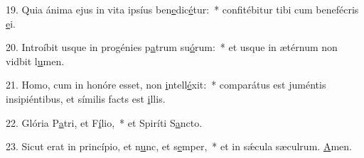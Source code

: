 19. Quia ánima ejus in vita ipsíus ben\uline{e}dic\uline{é}tur:~* confitébitur tibi cum benefécris \uline{e}i.\par 
20. Introíbit usque in progénies p\uline{a}trum su\uline{ó}rum:~* et usque in ætérnum non vidbit l\uline{u}men.\par 
21. Homo, cum in honóre esset, non \uline{i}ntell\uline{é}xit:~* comparátus est juméntis insipiéntibus, et símilis facts est \uline{i}llis.\par 
22. Glória P\uline{a}tri, et F\uline{í}lio,~* et Spiríti S\uline{a}ncto.\par 
23. Sicut erat in princípio, et n\uline{u}nc, et s\uline{e}mper,~* et in sǽcula sæculrum. \uline{A}men.\par 
